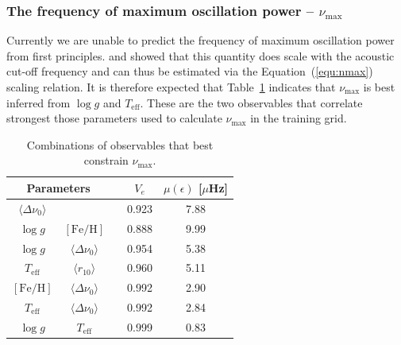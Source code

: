 \subsubsection*{The frequency of maximum oscillation power -- $\nu_{\max}$} 


Currently we are unable to predict the frequency of maximum oscillation power from first principles. \citet{1991ApJ...368..599B} and \citet{1995AA...293...87K} showed that this quantity does scale with the acoustic cut-off frequency and can thus be estimated via the Equation~(\ref{equ:nmax}) scaling relation. It is therefore expected that Table~\ref{tab:nmx} indicates that  $\nu_{\max}$ is best inferred from ${\log{} g}$  and $T_{\text{eff}}$. These are the two observables that correlate strongest those parameters used to calculate $\nu_{\max}$ in the training grid. 

\begin{table}
\centering
\caption{Combinations of observables that  best constrain $\nu_{\max}$.}
    \begin{tabular}{ccccc}
\hline    \hline
\multicolumn{2}{c}{Parameters} && $V_e$ &$\mu (\epsilon)$ [$\mu$Hz] \\ \hline 
$\langle\Delta\nu_0\rangle$ &&&0.923  & 7.88 \\
$\log{} g$ & $[\text{Fe/H}]$ && 0.888 & 9.99 \\
$\log{} g$     & $\langle\Delta\nu_0\rangle$     &&0.954  & 5.38\\
$T_{\text{eff}}$     & $\langle r_{10}\rangle$ &   &0.960  & 5.11\\
$[\text{Fe/H}]$    &$\langle\Delta\nu_0\rangle$        &       &0.992  & 2.90\\
$T_{\text{eff}}$     & $\langle\Delta\nu_0\rangle$    &  &0.992  & 2.84\\
$\log{} g$  & $T_{\text{eff}}$                 &&0.999  & 0.83\\
\hline
    \end{tabular}
    \label{tab:nmx}
\end{table}


